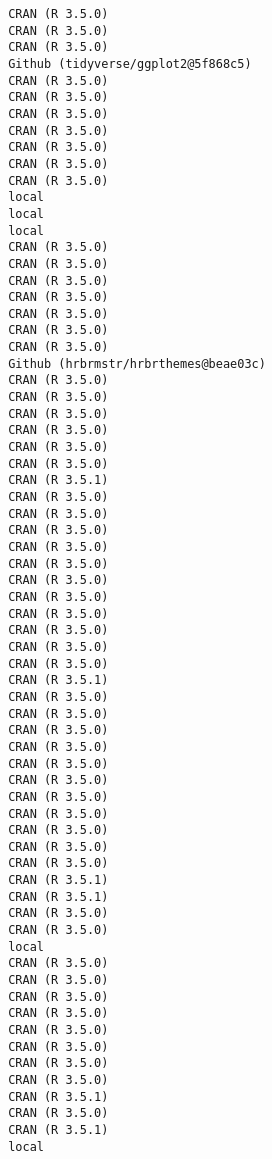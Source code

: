 \documentclass[twoside,12pt,final]{ucthesis-CA2012}
\begin{document}
\begin{ucmainmatter}
\begin{verbatim}
 CRAN (R 3.5.0)                      
 CRAN (R 3.5.0)                      
 CRAN (R 3.5.0)                      
 Github (tidyverse/ggplot2@5f868c5)  
 CRAN (R 3.5.0)                      
 CRAN (R 3.5.0)                      
 CRAN (R 3.5.0)                      
 CRAN (R 3.5.0)                      
 CRAN (R 3.5.0)                      
 CRAN (R 3.5.0)                      
 CRAN (R 3.5.0)                      
 local                               
 local                               
 local                               
 CRAN (R 3.5.0)                      
 CRAN (R 3.5.0)                      
 CRAN (R 3.5.0)                      
 CRAN (R 3.5.0)                      
 CRAN (R 3.5.0)                      
 CRAN (R 3.5.0)                      
 CRAN (R 3.5.0)                      
 Github (hrbrmstr/hrbrthemes@beae03c)
 CRAN (R 3.5.0)                      
 CRAN (R 3.5.0)                      
 CRAN (R 3.5.0)                      
 CRAN (R 3.5.0)                      
 CRAN (R 3.5.0)                      
 CRAN (R 3.5.0)                      
 CRAN (R 3.5.1)                      
 CRAN (R 3.5.0)                      
 CRAN (R 3.5.0)                      
 CRAN (R 3.5.0)                      
 CRAN (R 3.5.0)                      
 CRAN (R 3.5.0)                      
 CRAN (R 3.5.0)                      
 CRAN (R 3.5.0)                      
 CRAN (R 3.5.0)                      
 CRAN (R 3.5.0)                      
 CRAN (R 3.5.0)                      
 CRAN (R 3.5.0)                      
 CRAN (R 3.5.1)                      
 CRAN (R 3.5.0)                      
 CRAN (R 3.5.0)                      
 CRAN (R 3.5.0)                      
 CRAN (R 3.5.0)                      
 CRAN (R 3.5.0)                      
 CRAN (R 3.5.0)                      
 CRAN (R 3.5.0)                      
 CRAN (R 3.5.0)                      
 CRAN (R 3.5.0)                      
 CRAN (R 3.5.0)                      
 CRAN (R 3.5.0)                      
 CRAN (R 3.5.1)                      
 CRAN (R 3.5.1)                      
 CRAN (R 3.5.0)                      
 CRAN (R 3.5.0)                      
 local                               
 CRAN (R 3.5.0)                      
 CRAN (R 3.5.0)                      
 CRAN (R 3.5.0)                      
 CRAN (R 3.5.0)                      
 CRAN (R 3.5.0)                      
 CRAN (R 3.5.0)                      
 CRAN (R 3.5.0)                      
 CRAN (R 3.5.0)                      
 CRAN (R 3.5.1)                      
 CRAN (R 3.5.0)                      
 CRAN (R 3.5.1)                      
 local                               

\end{verbatim}
\end{ucmainmatter}
\end{document}
